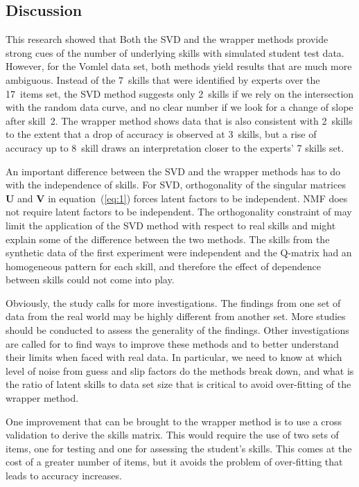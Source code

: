 \subsection{Discussion}
This research showed that Both the SVD and the wrapper methods provide strong cues of the number of underlying skills with simulated student test data.  However, for the Vomlel data set, both methods yield results that are much more ambiguous.  Instead of the 7~skills that were identified by experts over the 17~items set, the SVD method suggests only 2~skills if we rely on the intersection with the random data curve, and no clear number if we look for a change of slope after skill~2.  The wrapper method shows data that is also consistent with 2~skills to the extent that a drop of accuracy is observed at 3~skills, but a rise of accuracy up to 8~skill draws an interpretation closer to the experts' 7 skills set.

An important difference between the SVD and the wrapper methods has to do with the independence of skills.  For SVD, orthogonality of the singular matrices $\mathbf{U}$ and $\mathbf{V}$ in equation~(\ref{eq:1}) forces latent factors to be independent.  NMF does not require latent factors to be independent.  The orthogonality constraint of may limit the application of the SVD method with respect to real skills and might explain some of the difference between the two methods.  The skills from the synthetic data of the first experiment were independent and the Q-matrix had an homogeneous pattern for each skill, and therefore the effect of dependence between skills could not come into play.

Obviously, the study calls for more investigations.  The findings from one set of data from the real world may be highly different from another set. More studies should be conducted to assess the generality of the findings.  Other investigations are called for to find ways to improve these methods and to better understand their limits when faced with real data.  In particular, we need to know at which level of noise from guess and slip factors do the methods break down, and what is the ratio of latent skills to data set size that is critical to avoid over-fitting of the wrapper method.

One improvement that can be brought to the wrapper method is to use a cross validation to derive the skills matrix.  This would require the use of two sets of items, one for testing and one for assessing the student's skills.  This comes at the cost of a greater number of items, but it avoids the problem of over-fitting that leads to accuracy increases.

